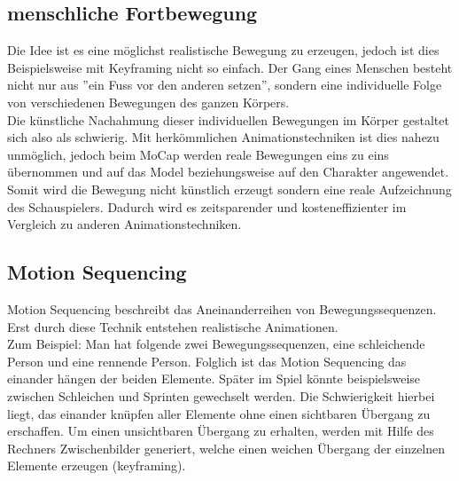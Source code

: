 \subsection{menschliche Fortbewegung}

Die Idee ist es eine möglichst realistische Bewegung zu erzeugen, jedoch ist 
dies Beispielsweise mit Keyframing nicht so einfach. Der Gang eines Menschen 
besteht nicht nur aus ''ein Fuss vor den anderen setzen'', sondern eine individuelle 
Folge von verschiedenen Bewegungen des ganzen Körpers. \\
Die künstliche Nachahmung dieser individuellen Bewegungen im Körper gestaltet sich also als schwierig. 
Mit herkömmlichen Animationstechniken ist dies nahezu unmöglich, jedoch beim MoCap 
werden reale Bewegungen eins zu eins übernommen und auf das Model beziehungsweise 
auf den Charakter angewendet. Somit wird die Bewegung nicht künstlich erzeugt sondern 
eine reale Aufzeichnung des Schauspielers. Dadurch wird es zeitsparender und kosteneffizienter
im Vergleich zu anderen Animationstechniken.

\subsection{Motion Sequencing}
Motion Sequencing beschreibt das Aneinanderreihen von Bewegungssequenzen. Erst durch diese Technik
entstehen realistische Animationen. \\
Zum Beispiel: Man hat folgende zwei Bewegungssequenzen, eine
schleichende Person und eine rennende Person. Folglich ist das Motion Sequencing das einander hängen 
der beiden Elemente. Später im Spiel könnte beispielsweise zwischen Schleichen und Sprinten gewechselt
werden. Die Schwierigkeit hierbei liegt, das einander knüpfen aller Elemente ohne einen sichtbaren
Übergang zu erschaffen. Um einen unsichtbaren Übergang zu erhalten, werden mit Hilfe des Rechners 
Zwischenbilder generiert, welche einen weichen Übergang der einzelnen Elemente erzeugen (keyframing).
 	


